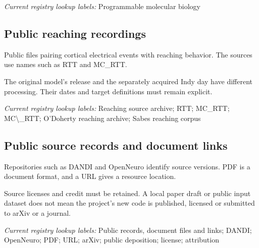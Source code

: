 \noindent\textit{Current registry lookup labels:} Programmable molecular biology\par

\begin{samepage}
\subsection*{Public reaching recordings}
\noindent Public files pairing cortical electrical events with reaching behavior. The sources use names such as RTT and MC\_RTT.\par
\end{samepage}
\begin{samepage}
\noindent The original model’s release and the separately acquired Indy day have different processing. Their dates and target definitions must remain explicit.\par\nopagebreak[4]

\end{samepage}


\noindent\textit{Current registry lookup labels:} Reaching source archive; RTT; MC\_RTT; MC\textbackslash{}\_RTT; O'Doherty reaching archive; Sabes reaching corpus\par

\begin{samepage}
\subsection*{Public source records and document links}
\noindent Repositories such as DANDI and OpenNeuro identify source versions. PDF is a document format, and a URL gives a resource location.\par
\end{samepage}
\begin{samepage}
\noindent Source licenses and credit must be retained. A local paper draft or public input dataset does not mean the project’s new code is published, licensed or submitted to arXiv or a journal.\par\nopagebreak[4]

\end{samepage}


\noindent\textit{Current registry lookup labels:} Public records, document files and links; DANDI; OpenNeuro; PDF; URL; arXiv; public deposition; license; attribution\par

